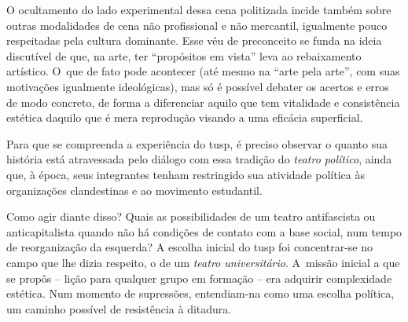 O ocultamento do lado experimental dessa cena politizada incide também
sobre outras modalidades de cena não profissional e não mercantil,
igualmente pouco respeitadas pela cultura dominante. Esse véu de
preconceito se funda na ideia discutível de que, na arte, ter “propósitos em
vista” leva ao rebaixamento artístico. O~que de
fato pode acontecer (até mesmo na “arte pela arte”, com suas motivações
igualmente ideológicas), mas só é possível debater os acertos e erros de
modo concreto, de forma a diferenciar aquilo que tem vitalidade e
consistência estética daquilo que é mera reprodução visando a uma
eficácia superficial.

Para que se compreenda a experiência do {\sc tusp}, é preciso observar o
quanto sua história está atravessada pelo diálogo com essa tradição do
{\it teatro político}, ainda que, à época, seus integrantes tenham restringido sua atividade política às organizações clandestinas e ao movimento
estudantil.


Como agir diante disso? Quais as possibilidades de um teatro
antifascista ou anticapitalista quando não há condições de contato com a
base social, num tempo de reorganização da esquerda? A escolha inicial
do {\sc tusp} foi concentrar-se no campo que lhe dizia respeito, o de um
{\it teatro universitário}. A~missão inicial a que se propôs -- lição
para qualquer grupo em formação -- era adquirir complexidade estética.
Num momento de supressões, entendiam-na como uma escolha
política, um caminho possível de resistência à ditadura.


